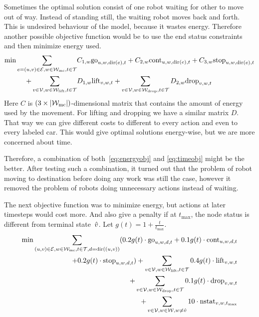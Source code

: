 Sometimes the optimal solution consist of one robot waiting for other to move
out of way. Instead of standing still, the waiting robot moves back and forth.
This is undesired behaviour of the model, because it wastes energy. Therefore
another possible objective function would be to use the end status constraints
and then minimize energy used.
\begin{align}
    \begin{split}
        \label{eq:energyobj}
        \min \sum_{e=(u,v) \in \mathcal{E},w \in \mathcal{W}_\mathrm{mc},t \in \mathcal{T}}
        &C_{1,w} \mathrm{go}_{u,w,\mathrm{dir}(e),t} + C_{2,w} \mathrm{cont}_{u,w,\mathrm{dir}(e),t} + C_{3,w}
        \mathrm{stop}_{u,w,\mathrm{dir}(e),t}\\
        +\sum_{v \in \mathcal{V}, w \in \mathcal{W}_\mathrm{lift},t \in \mathcal{T}} &D_{1,w} \mathrm{lift}_{v,w,t}
        +\sum_{v \in \mathcal{V}, w \in \mathcal{W}_\mathrm{drop},t \in \mathcal{T}} D_{2,w} \mathrm{drop}_{v,w,t}
    \end{split}
\end{align}
Here $C$ is $(3 \times |\mathcal{W}_\mathrm{mc}|)$-dimensional matrix that contains the amount of
energy used by the movement. For lifting and dropping we have a similar matrix
$D$. That way we can give different costs to different to every action and even
to every labeled car. This would give optimal solutions energy-wise,
but we are more concerned about time.

Therefore, a combination of both~\eqref{eq:energyobj} and \eqref{eq:timeobj}
might be the better. After testing such a combination, it turned out that the
problem of robot moving to destination before doing any work was still the
case, however it removed the problem of robots doing unnecessary
actions instead of waiting.

The next objective function was to minimize energy, but actions at later
timesteps would cost more. And also give a penalty if at $t_{\max}$, the node
status is different from terminal state~$\hat{v}$. Let $g(t) = 1 +
\frac{t}{t_{\max}}$.
\begin{align}
    \begin{split}
        \label{eq:objective}
        \min \sum_{(u,v) \in \mathcal{E},w \in \mathcal{W}_\mathrm{mc},t \in \mathcal{T},d=\mathrm{dir}((u,v))}(0.2 g(t) \cdot
        \mathrm{go}_{u,w,d,t} + 0.1 g(t) \cdot \mathrm{cont}_{u,w,d,t}\\ + 0.2 g(t)
        \cdot \mathrm{stop}_{u,w,d,t})
        +\sum_{v \in \mathcal{V}, w \in \mathcal{W}_\mathrm{lift},t \in \mathcal{T}} 0.4 g(t) \cdot \mathrm{lift}_{v,w,t}\\
        +\sum_{v \in \mathcal{V}, w \in \mathcal{W}_\mathrm{drop},t \in \mathcal{T}} 0.1 g(t) \cdot \mathrm{drop}_{v,w,t}\\
        +\sum_{v \in \mathcal{V}, w \in \mathcal{W}, w \neq \hat{v}} 10 \cdot
        \mathrm{nstat}_{v,w,t_{\max}}
    \end{split}
\end{align}

